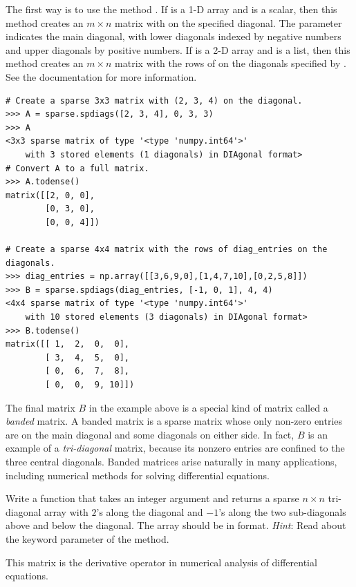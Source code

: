 The first way is to use the method . 
If  is a 1-D array and  is a scalar, then this method creates an $m \times n$ matrix with  on the specified diagonal. 
The parameter  indicates the main diagonal, with lower diagonals indexed by negative numbers and upper diagonals by positive numbers. 
If  is a 2-D array and  is a list, then this method creates an $m \times n$ matrix with the rows of  on the diagonals specified by . 
See the documentation for more information.
\begin{lstlisting}
# Create a sparse 3x3 matrix with (2, 3, 4) on the diagonal.
>>> A = sparse.spdiags([2, 3, 4], 0, 3, 3)
>>> A
<3x3 sparse matrix of type '<type 'numpy.int64'>'
	with 3 stored elements (1 diagonals) in DIAgonal format>
# Convert A to a full matrix.
>>> A.todense()
matrix([[2, 0, 0],
        [0, 3, 0],
        [0, 0, 4]])
	
# Create a sparse 4x4 matrix with the rows of diag_entries on the diagonals.
>>> diag_entries = np.array([[3,6,9,0],[1,4,7,10],[0,2,5,8]])
>>> B = sparse.spdiags(diag_entries, [-1, 0, 1], 4, 4)
<4x4 sparse matrix of type '<type 'numpy.int64'>'
	with 10 stored elements (3 diagonals) in DIAgonal format>
>>> B.todense()
matrix([[ 1,  2,  0,  0],
        [ 3,  4,  5,  0],
        [ 0,  6,  7,  8],
        [ 0,  0,  9, 10]])
\end{lstlisting}

The final matrix $B$ in the example above is a special kind of matrix called a \emph{banded} matrix. 
A banded matrix is a sparse matrix whose only non-zero entries are on the main diagonal and some diagonals on either side. 
In fact, $B$ is an example of a \emph{tri-diagonal} matrix, because its nonzero entries are confined to the three central diagonals. 
Banded matrices arise naturally in many applications, including numerical methods for solving differential equations. 

\begin{problem}
Write a function that takes an integer argument  and returns a sparse $n\times n$
tri-diagonal array with $2$'s along the diagonal and $-1$'s along
the two sub-diagonals above and below the diagonal. 
The array should be in  format.
\emph{Hint}: Read about the  keyword parameter of the  method.

This matrix is the derivative operator in numerical analysis of differential equations.
\label{prob:sparse_tridiag}
\end{problem}


